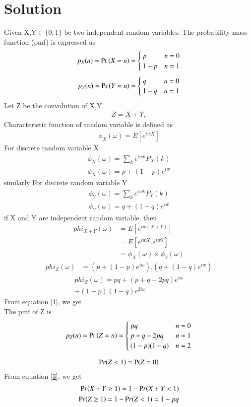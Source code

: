 \documentclass[journal,12pt,twocolumn]{IEEEtran}
\begin{document}
\section*{Solution}
Given X,Y$\in \{0,1\}$ be two independent random variables. The probability mass function (pmf) is expressed  as 
\begin{align}
    p_{X}(n) = \Pr\left(X = n\right) = 
\begin{cases}
p & n=0
\\
1-p & n=1
\end{cases}\label{1}
\end{align}
\begin{align}
    p_{Y}(n) = \Pr\left(Y = n\right) = 
\begin{cases}
q & n=0
\\
1-q & n=1
\end{cases}\label{1}
\end{align}
Let Z be the convolution of X,Y.
\begin{align}
  Z=X+Y,
  \end{align}
  Characteristic function of random variable is defined as\\
\begin{align}
\phi_X(\omega)=E[e^{iwX}]
\end{align}
For discrete random variable X
\begin{align}
 \label{1}  \phi_X(\omega) =\sum_{k}e^{iwk}P_X(k)\\
\phi_X(\omega)= p+(1-p)e^{iw}
\end{align}
similarly For discrete random variable Y
\begin{align}
\phi_Y(\omega) = \sum_{k}e^{iwk}P_Y(k)\\
\phi_Y(\omega)= q+(1-q)e^{iw}
\end{align}
if X and Y are independent random variable, then
\begin{align}
phi_{X+Y}(\omega)&=E[e^{iw(X+Y)}] \\
               &=E[e^{iwX}.e^{iwY}] \\
               &=\phi_X(\omega)\times \phi_Y(\omega)
\end{align}
\begin{align}
  phi_{Z}(\omega)& =(p+(1-p)e^{iw}).(q+(1-q)e^{iw})
  \end{align}
  \begin{multline}
phi_{Z}(\omega) = pq+(p+q-2pq)e^{iw}\\
  +(1-p)(1-q)e^{2iw}
\end{multline}
  From equation \eqref{1}, we get\\
    The pmf of Z is 
\begin{align}
    p_{Z}(n) = \Pr\left(Z = n\right) = 
\begin{cases}
pq & n=0
\\
p+q-2pq & n=1\\
(1-p)(1-q) & n=2
\end{cases}\label{2}
\end{align}

\begin{align}
  \mbox Pr(Z<1) = \mbox P(Z=0)  \label{3} 
  \end{align}
  From equation \eqref{3}, we get
\begin{align}
  \mbox Pr(X+Y\geq1) = 1 - \mbox Pr(X+Y<1)\\
  \mbox Pr(Z\geq1)= 1-\mbox Pr(Z<1) = 1-pq   
\end{align}
\end{document}
